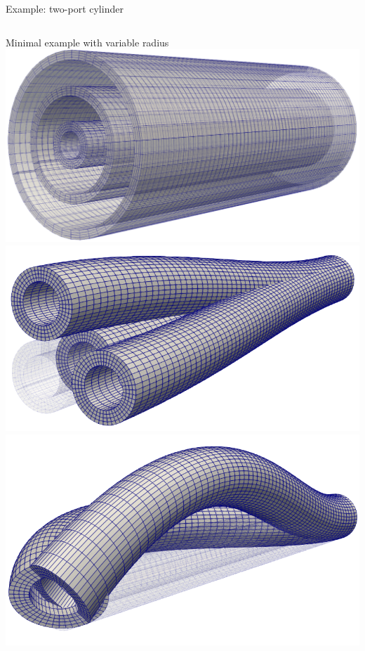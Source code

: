 \documentclass{sintefbeamer}
\begin{document}
\begin{frame}{Example: two-port cylinder}
    \begin{columns}
        Minimal example with variable radius \\
        \vspace{1cm}
        \includegraphics[height=0.4\textheight,trim={0 0 0 0},clip]{images/radii.png}
        \includegraphics[height=0.4\textheight,trim={0 0 0 0},clip]{images/transdofs.png}
        \includegraphics[height=0.45\textheight,trim={0 0 0 0},clip]{images/rotdofs.png}
    \end{columns}
\end{frame}
\end{document}
